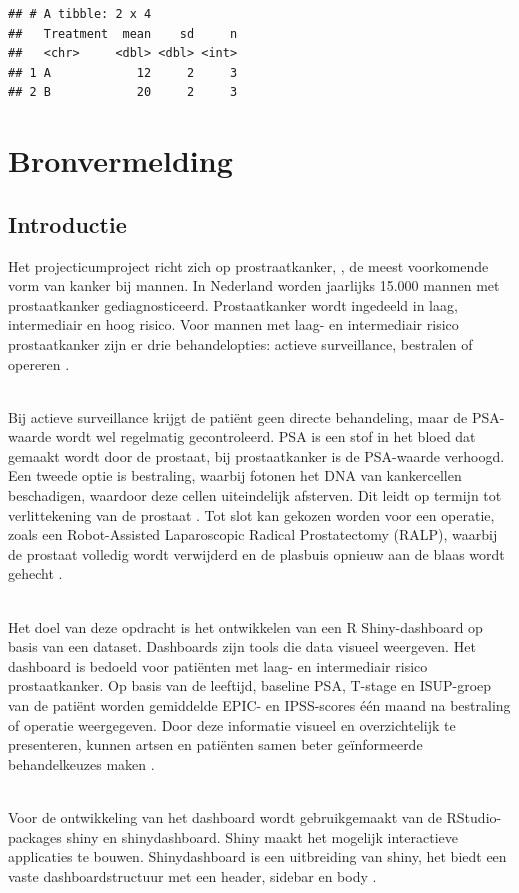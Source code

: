\documentclass[
]{book}
\begin{document}
\begin{verbatim}
## # A tibble: 2 x 4
##   Treatment  mean    sd     n
##   <chr>     <dbl> <dbl> <int>
## 1 A            12     2     3
## 2 B            20     2     3
\end{verbatim}

\chapter{Bronvermelding}\label{bronvermelding}

\section{Introductie}\label{introductie-1}

Het projecticumproject richt zich op prostraatkanker, , de meest voorkomende vorm van kanker bij mannen. In Nederland worden jaarlijks 15.000 mannen met prostaatkanker gediagnosticeerd. Prostaatkanker wordt ingedeeld in laag, intermediair en hoog risico. Voor mannen met laag- en intermediair risico prostaatkanker zijn er drie behandelopties: actieve surveillance, bestralen of opereren \citep{CijfersProstaatkanker, BiologyProstateSpecificAntigen}.\\
\strut \\
Bij actieve surveillance krijgt de patiënt geen directe behandeling, maar de PSA-waarde wordt wel regelmatig gecontroleerd. PSA is een stof in het bloed dat gemaakt wordt door de prostaat, bij prostaatkanker is de PSA-waarde verhoogd. Een tweede optie is bestraling, waarbij fotonen het DNA van kankercellen beschadigen, waardoor deze cellen uiteindelijk afsterven. Dit leidt op termijn tot verlittekening van de prostaat \citep{BiologyProstateSpecificAntigen}. Tot slot kan gekozen worden voor een operatie, zoals een Robot-Assisted Laparoscopic Radical Prostatectomy (RALP), waarbij de prostaat volledig wordt verwijderd en de plasbuis opnieuw aan de blaas wordt gehecht \citep{OverviewMayoClinic}.\\
\strut \\
Het doel van deze opdracht is het ontwikkelen van een R Shiny-dashboard op basis van een dataset. Dashboards zijn tools die data visueel weergeven. Het dashboard is bedoeld voor patiënten met laag- en intermediair risico prostaatkanker. Op basis van de leeftijd, baseline PSA, T-stage en ISUP-groep van de patiënt worden gemiddelde EPIC- en IPSS-scores één maand na bestraling of operatie weergegeven. Door deze informatie visueel en overzichtelijk te presenteren, kunnen artsen en patiënten samen beter geïnformeerde behandelkeuzes maken \citep{ShinyDashboard}.\\
\strut \\
Voor de ontwikkeling van het dashboard wordt gebruikgemaakt van de RStudio-packages shiny en shinydashboard. Shiny maakt het mogelijk interactieve applicaties te bouwen. Shinydashboard is een uitbreiding van shiny, het biedt een vaste dashboardstructuur met een header, sidebar en body \citep{ShinyDashboard, zotero-item-18}.\\
\strut \\
\end{document}
